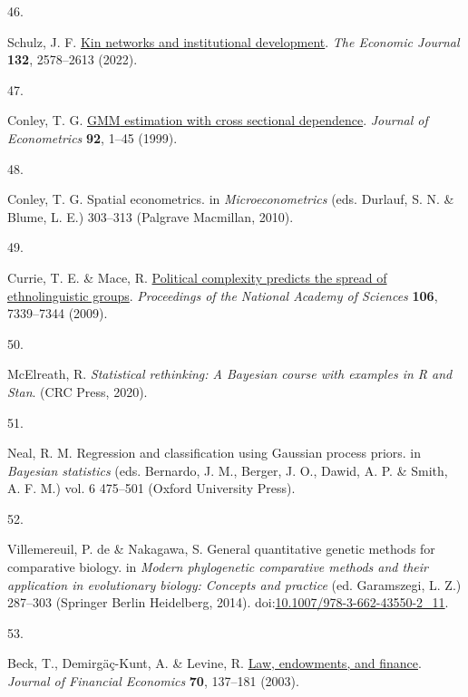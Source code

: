 \documentclass[
  man,floatsintext]{apa6}
\newlength{\cslhangindent}
\newlength{\csllabelwidth}
\newlength{\cslentryspacingunit} %
\newenvironment{CSLReferences}[2] %
 {%
  \setlength{\parindent}{0pt}
  \ifodd #1
  \let\oldpar\par
  \def\par{\hangindent=\cslhangindent\oldpar}
  \fi
  \setlength{\parskip}{#2\cslentryspacingunit}
 }%
 {}
\newcommand{\CSLLeftMargin}[1]{\parbox[t]{\csllabelwidth}{#1}}
\newcommand{\CSLRightInline}[1]{\parbox[t]{\linewidth - \csllabelwidth}{#1}\break}
\begin{document}
\begin{CSLReferences}{0}{0}
\leavevmode{}%
\CSLLeftMargin{46. }%
\CSLRightInline{Schulz, J. F. \href{https://doi.org/10.1093/ej/ueac027}{Kin networks and institutional development}. \emph{The Economic Journal} \textbf{132}, 2578--2613 (2022).}

\leavevmode{}%
\CSLLeftMargin{47. }%
\CSLRightInline{Conley, T. G. \href{https://doi.org/10.1016/S0304-4076(98)00084-0}{{GMM} estimation with cross sectional dependence}. \emph{Journal of Econometrics} \textbf{92}, 1--45 (1999).}

\leavevmode{}%
\CSLLeftMargin{48. }%
\CSLRightInline{Conley, T. G. Spatial econometrics. in \emph{Microeconometrics} (eds. Durlauf, S. N. \& Blume, L. E.) 303--313 (Palgrave Macmillan, 2010).}

\leavevmode{}%
\CSLLeftMargin{49. }%
\CSLRightInline{Currie, T. E. \& Mace, R. \href{https://doi.org/10.1073/pnas.0804698106}{Political complexity predicts the spread of ethnolinguistic groups}. \emph{Proceedings of the National Academy of Sciences} \textbf{106}, 7339--7344 (2009).}

\leavevmode{}%
\CSLLeftMargin{50. }%
\CSLRightInline{McElreath, R. \emph{Statistical rethinking: A {B}ayesian course with examples in {R} and {Stan}}. (CRC Press, 2020).}

\leavevmode{}%
\CSLLeftMargin{51. }%
\CSLRightInline{Neal, R. M. Regression and classification using {Gaussian} process priors. in \emph{Bayesian statistics} (eds. Bernardo, J. M., Berger, J. O., Dawid, A. P. \& Smith, A. F. M.) vol. 6 475--501 (Oxford University Press).}

\leavevmode{}%
\CSLLeftMargin{52. }%
\CSLRightInline{Villemereuil, P. de \& Nakagawa, S. General quantitative genetic methods for comparative biology. in \emph{Modern phylogenetic comparative methods and their application in evolutionary biology: Concepts and practice} (ed. Garamszegi, L. Z.) 287--303 (Springer Berlin Heidelberg, 2014). doi:\href{https://doi.org/10.1007/978-3-662-43550-2_11}{10.1007/978-3-662-43550-2\_11}.}

\leavevmode{}%
\CSLLeftMargin{53. }%
\CSLRightInline{Beck, T., Demirgäç-Kunt, A. \& Levine, R. \href{https://doi.org/10.1016/S0304-405X(03)00144-2}{Law, endowments, and finance}. \emph{Journal of Financial Economics} \textbf{70}, 137--181 (2003).}


\end{CSLReferences}
\end{document}

